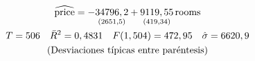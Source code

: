 
\begin{gather}
\widehat{\rm price} = 
-\underset{(2651,5)}{34796,2}
+\underset{(419,34)}{9119,55}\,\mbox{rooms}
 \notag \\
T = 506 \quad \bar{R}^2 = 0,4831 \quad F(1,504) = 472,95 \quad \hat{\sigma} = 6620,9 \notag \\
\centerline{(Desviaciones típicas entre paréntesis)} \notag
\end{gather}
